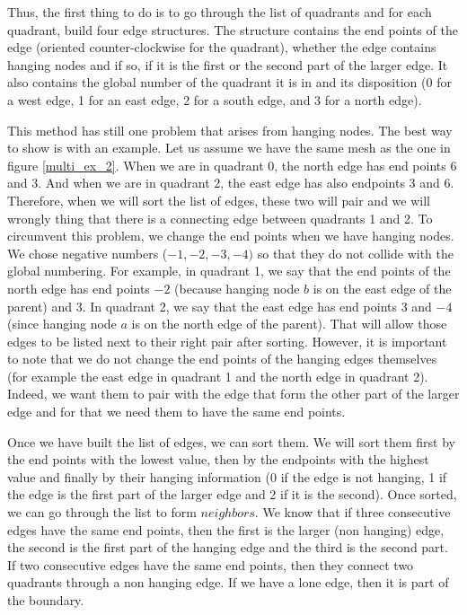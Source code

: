 Thus, the first thing to do is to go through the list of quadrants and for each quadrant, build four edge structures. The structure contains the end points of the edge (oriented counter-clockwise for the quadrant), whether the edge contains hanging nodes and if so, if it is the first or the second part of the larger edge. It also contains the global number of the quadrant it is in and its disposition (0 for a west edge, 1 for an east edge, 2 for a south edge, and 3 for a north edge).

This method has still one problem that arises from hanging nodes. The best way to show is with an example. Let us assume we have the same mesh as the one in figure \ref{multi_ex_2}. When we are in quadrant 0, the north edge has end points 6 and 3. And when we are in quadrant 2, the east edge has also endpoints 3 and 6. Therefore, when we will sort the list of edges, these two will pair and we will wrongly thing that there is a connecting edge between quadrants 1 and 2. To circumvent this problem, we change the end points when we have hanging nodes. We chose negative numbers ($-1,-2,-3,-4)$ so that they do not collide with the global numbering. For example, in quadrant 1, we say that the end points of the north edge has end points $-2$ (because hanging node $b$ is on the east edge of the parent) and 3. In quadrant 2, we say that the east edge has end points 3 and $-4$ (since hanging node $a$ is on the north edge of the parent). That will allow those edges to be listed next to their right pair after sorting. However, it is important to note that we do not change the end points of the hanging edges themselves (for example the east edge in quadrant 1 and the north edge in quadrant 2). Indeed, we want them to pair with the edge that form the other part of the larger edge and for that we need them to have the same end points. 

Once we have built the list of edges, we can sort them. We will sort them first by the end points with the lowest value, then by the endpoints with the highest value and finally by their hanging information (0 if the edge is not hanging, 1 if the edge is the first part of the larger edge and 2 if it is the second). Once sorted, we can go through the list to form $neighbors$. We know that if three consecutive edges have the same end points, then the first is the larger (non hanging) edge, the second is the first part of the hanging edge and the third is the second part. If two consecutive edges have the same end points, then they connect two quadrants through a non hanging edge. If we have a lone edge, then it is part of the boundary. 

